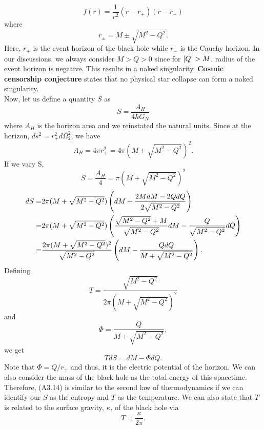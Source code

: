 \begin{appendices}
        \begin{equation}
            f(r) = \frac{1}{r^2}(r-r_+)(r-r_-)
        \end{equation}
        where
        \begin{equation}
            r_\pm = M \pm \sqrt{M^2-Q^2}.
        \end{equation}
        Here, $r_+$ is the event horizon of the black hole while $r_-$ is the Cauchy horizon. In our discussions, we always consider $M>Q>0$ since for $\abs{Q}>M$, radius of the event horizon is negative. This results in a naked singularity. \textbf{Cosmic censorship conjecture} states that no physical star collapse can form a naked singularity. \\
        Now, let us define a quantity $S$ as
        \begin{equation}
            S = \frac{A_H}{4\hbar G_N}
        \end{equation}
        where $A_H$ is the horizon area and we reinstated the natural units. Since at the horizon, $ds^2 = r_+^2d\Omega_2^2$, we have
        \begin{equation}
            A_H = 4\pi r_+^2 = 4\pi(M+\sqrt{M^2-Q^2})^2.
        \end{equation}
        If we vary S,
        \begin{equation}
            S = \frac{A_H}{4} = \pi(M+\sqrt{M^2-Q^2})^2
        \end{equation}
        \begin{align}
            dS =& 2\pi(M+\sqrt{M^2-Q^2})\left( dM + \frac{2MdM-2QdQ}{2\sqrt{M^2-Q^2}} \right)\notag \\ 
                =& 2\pi(M+\sqrt{M^2-Q^2})\left( \frac{\sqrt{M^2-Q^2}+M}{\sqrt{M^2-Q^2}}dM-\frac{Q}{\sqrt{M^2-Q^2}}dQ \right)\notag \\
                =& \frac{2\pi(M+\sqrt{M^2-Q^2})^2}{\sqrt{M^2-Q^2}}\left( dM-\frac{QdQ}{M+\sqrt{M^2-Q^2}} \right).
        \end{align}
        Defining
        \begin{equation}
            T = \frac{\sqrt{M^2-Q^2}}{2\pi(M+\sqrt{M^2-Q^2})^2}
        \end{equation}
        and 
        \begin{equation}
            \Phi = \frac{Q}{M+\sqrt{M^2-Q^2}},
        \end{equation}
        we get
        \begin{equation}
            TdS = dM - \Phi dQ.
        \end{equation}
        Note that $\Phi = Q/r_+$ and thus, it is the electric potential of the horizon. We can also consider the mass of the black hole as the total energy of this spacetime. Therefore, (A3.14) is similar to the second law of thermodynamics if we can identify our $S$ as the entropy and $T$ as the temperature. We can also state that $T$ is related to the surface gravity, $\kappa$, of the black hole via
        \begin{equation}
            T = \frac{\kappa}{2\pi}.
        \end{equation} 


\end{appendices}
